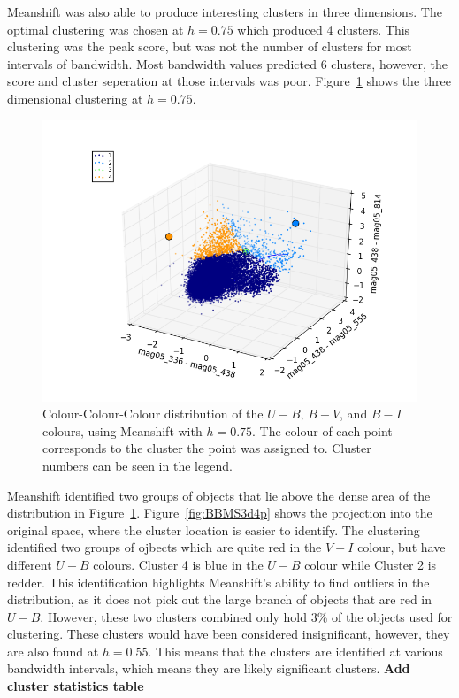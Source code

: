 Meanshift was also able to produce interesting clusters in three dimensions. 
The optimal clustering was chosen at $h=0.75$ which produced 4 clusters.
This clustering was the peak score, but was not the number of clusters for most intervals of bandwidth.
Most bandwidth values predicted 6 clusters, however, the score and cluster seperation at those intervals was poor.
Figure~\ref{fig:BB3dMS4} shows the three dimensional clustering at $h=0.75$.

\begin{figure}[H]
\centering
\includegraphics[width=\linewidth]{figs/broad/meanshift_3d_4cl_mag05_336-mag05_438vsmag05_438-mag05_555vsmag05_438-mag05_814}
\caption{Colour-Colour-Colour distribution of the $U - B$, $B - V$, and $B - I$ colours, using Meanshift with $h=0.75$. The colour of each point corresponds to the cluster the point was assigned to. Cluster numbers can be seen in the legend.}
\label{fig:BB3dMS4}
\end{figure}

Meanshift identified two groups of objects that lie above the dense area of the distribution in Figure~\ref{fig:BB3dMS4}.
Figure~\ref{fig:BBMS3d4p} shows the projection into the original space, where the cluster location is easier to identify.
The clustering identified two groups of ojbects which are quite red in the $V - I$ colour, but have different $U - B$ colours. 
Cluster 4 is blue in the $U - B$ colour while Cluster 2 is redder.
This identification highlights Meanshift's ability to find outliers in the distribution, as it does not pick out the large branch of objects that are red in $U - B$.
However, these two clusters combined only hold 3\% of the objects used for clustering.
These clusters would have been considered insignificant, however, they are also found at $h = 0.55$.
This means that the clusters are identified at various bandwidth intervals, which means they are likely significant clusters. 
\textbf{Add cluster statistics table}

